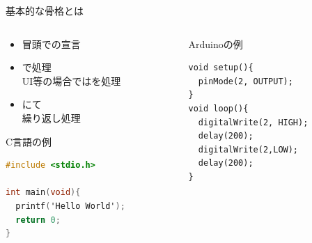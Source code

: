 \documentclass[dvipdfmx]{beamer}
\begin{document}
  \begin{frame}[fragile]{基本的な骨格とは}
    \begin{columns}
      \begin{column}{0.6\textwidth}
        \begin{itemize}
          \item 冒頭での宣言
          \item {}で処理\\UI等の場合ではを処理
          \item {}にて\\繰り返し処理
        \end{itemize}
        \centering
        \begin{minipage}{0.8\textwidth}
          \begin{exampleblock}{C言語の例}
            \begin{lstlisting}[language=C]
#include <stdio.h>

int main(void){
  printf('Hello World');
  return 0;
}    
            \end{lstlisting}
          \end{exampleblock}
        \end{minipage}
      \end{column}
      \begin{column}{0.4\textwidth}
        \begin{exampleblock}{Arduinoの例}
          \begin{lstlisting}[language=Arduino]
void setup(){
  pinMode(2, OUTPUT);
}
void loop(){
  digitalWrite(2, HIGH);
  delay(200);
  digitalWrite(2,LOW);
  delay(200);
}

          \end{lstlisting}
        \end{exampleblock}
      \end{column}
    \end{columns}
  \end{frame}
\end{document}

